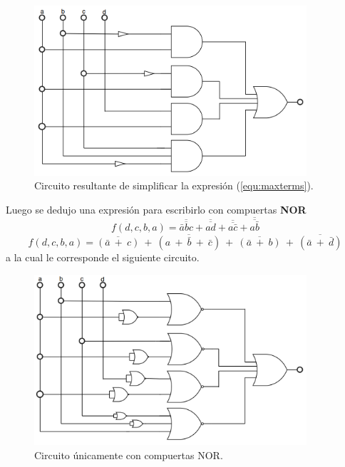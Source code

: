 \documentclass[a4paper]{article}
\begin{document}
\begin{figure}[H]
	\centering
	\includegraphics[width=0.9\textwidth]{Circuito2.PNG}
\caption{Circuito resultante de simplificar la expresión (\ref{equ:maxterms}).}
	\label{fig:circ2}
\end{figure}
Luego se dedujo una expresión para escribirlo con compuertas \textbf{NOR}
\[
	f \left( d,c,b,a \right) = \overline{\overline{\bar{a} b c}} + \overline{\overline{a d}} + \overline{\overline{a \bar{c}}} + \overline{\overline{a \bar{b}}}
\]
\[
	f \left( d,c,b,a \right) = \overline{ \left( \bar{a} \ + \ c \right) } \ + \ \overline{ \left( a \ + \ \bar{b} \ + \ \bar{c} \right) } \ + \ \overline{ \left( \bar{a} \ + \ b \right) } \ + \ \overline{ \left( \bar{a} \ + \ \bar{d}\right) }
\]
a la cual le corresponde el siguiente circuito.

\begin{figure}[H]
	\centering
	\includegraphics[width=0.9\textwidth]{Circuito5.png}
\caption{Circuito únicamente con compuertas NOR.}
	\label{fig:circ5}
\end{figure}
\end{document}
